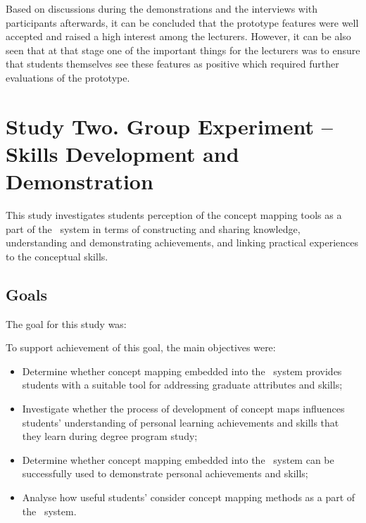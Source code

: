 Based on discussions during the demonstrations and the interviews with
participants afterwards, it can be concluded that the prototype features were
well accepted and raised a high interest among the lecturers. However, it can be
also seen that at that stage one of the important things for the lecturers was
to ensure that students themselves see these features as positive which
required further evaluations of the prototype.

\section{Study Two. Group Experiment -- \LLLc Skills Development and
Demonstration}
\label{sec:two}

This study investigates students perception of the concept mapping tools as a
part of the \ep~system in terms of constructing and sharing knowledge,
understanding and demonstrating achievements, and linking practical experiences
to the conceptual skills.

\subsection{Goals}
The goal for this study was:


To support achievement of this goal, the main objectives were:

\begin{itemize}
  \item Determine whether concept mapping embedded into the \ep~system provides
  students with a suitable tool for addressing graduate attributes and \LLLs
  skills;
  \item Investigate whether the process of development of concept maps
  influences students' understanding of personal learning achievements and
  skills that they learn during degree program study;
  \item Determine whether concept mapping embedded into the \ep~system can be
  successfully used to demonstrate personal achievements and skills;
  \item Analyse how useful students' consider concept mapping methods as a part
  of the \ep~system.
\end{itemize}

